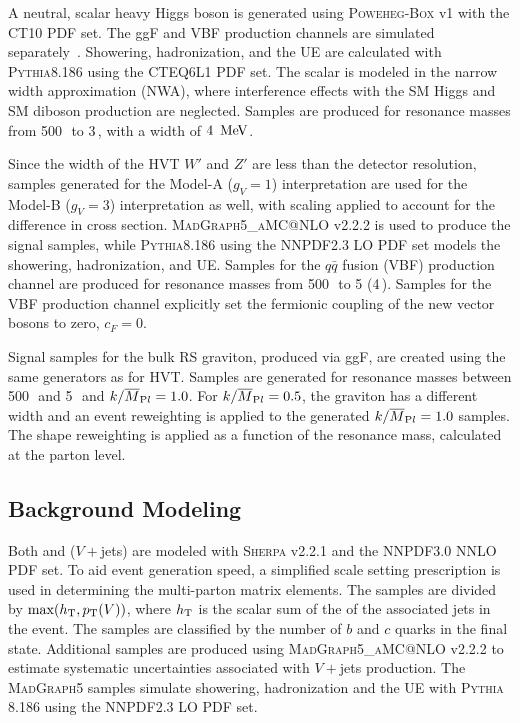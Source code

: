 A neutral, scalar heavy Higgs boson is generated using \textsc{Poweheg-Box} v1 with the \textsc{CT10} PDF set. The ggF and VBF production channels are simulated separately~\cite{heavy_higgs_VBF,heavy_higgs_ggF}.  Showering, hadronization, and the UE are calculated with \textsc{Pythia}8.186 using the \textsc{CTEQ6L1} PDF set. The scalar is modeled in the narrow width approximation (NWA), where interference effects with the SM Higgs and SM diboson production are neglected. Samples are produced for resonance masses from 500\,\GeV\, to 3\,\TeV, with a width of $4\,\MeV$.  

Since the width of the HVT $W'$ and $Z'$ are less than the detector resolution, samples generated for the Model-A ($g_V=1$) interpretation are used for the Model-B ($g_V=3$) interpretation as well, with scaling applied to account for the difference in cross section. \textsc{MadGraph5\_aMC@NLO} v2.2.2 is used to produce the signal samples, while \textsc{Pythia}8.186 using the \textsc{NNPDF2.3} LO PDF set models the showering, hadronization, and UE. %
Samples for the $q\bar{q}$ fusion (VBF) production channel are produced for resonance masses from 500\,\GeV\, to 5\,\TeV\,(4\,\TeV). Samples for the VBF production channel explicitly set the fermionic coupling of the new vector bosons to zero, $c_F=0$.

Signal samples for the bulk RS graviton, produced via ggF, are created using the same generators as for HVT. Samples are generated for resonance masses between 500\,\GeV\, and 5\,\TeV\, and $k/\overline{M}_{\textrm Pl}=1.0$. For $k/\overline{M}_{\textrm Pl}=0.5$, the graviton has a different width and an event reweighting is applied to the generated $k/\overline{M}_{\textrm Pl}=1.0$ samples. The shape reweighting is applied as a function of the resonance mass, calculated at the parton level.

%
\subsection{Background Modeling}
Both \Wjets and \Zjets ($V+$jets) are modeled with \textsc{Sherpa} v2.2.1 and the \textsc{NNPDF3.0} NNLO PDF set. To aid event generation speed, a simplified scale setting prescription is used in determining the multi-parton matrix elements. The samples are divided by $\textrm{max}(h_{\rm T},p_{\text{T}}(V))$, where $h_{\rm T}$ is the scalar sum of the \pt of the associated jets in the event. The samples are classified by the number of $b$ and $c$ quarks in the final state. Additional samples are produced using \textsc{MadGraph5\_aMC@NLO} v2.2.2 to estimate systematic uncertainties associated with $V+$jets production. The \textsc{MadGraph5} samples simulate showering, hadronization and the UE with \textsc{Pythia} 8.186 using the \textsc{NNPDF2.3} LO PDF set.

